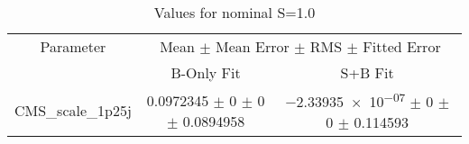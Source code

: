 \begin{table}
\centering
\caption{Values for nominal S=1.0}
\begin{tabular}{ccc}
\toprule
Parameter 	& \multicolumn{2}{c}{Mean $\pm$ Mean Error $\pm$ RMS $\pm$ Fitted Error}\\
 	& B-Only Fit & S+B Fit\\
\midrule
CMS\_scale\_1p25j 	& \num{0.0972345} $\pm$ \num{0} $\pm$ \num{0} $\pm$ \num{0.0894958} 	& \num{-2.33935e-07} $\pm$ \num{0} $\pm$ \num{0} $\pm$ \num{0.114593}\\
\bottomrule
\end{tabular}
\end{table}